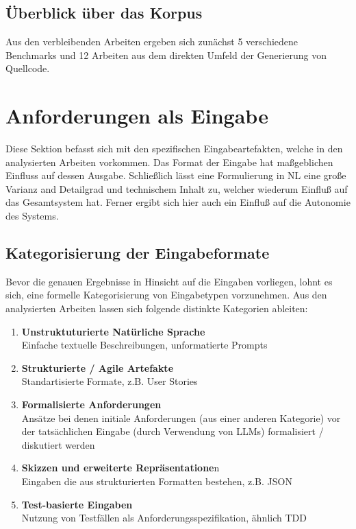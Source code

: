 \subsection{Überblick über das Korpus}

Aus den verbleibenden Arbeiten ergeben sich zunächst 5 verschiedene Benchmarks und 12 Arbeiten aus dem direkten Umfeld der Generierung von Quellcode. 

\section{Anforderungen als Eingabe}\label{ch:Anforderungen als Eingabe}

Diese Sektion befasst sich mit den spezifischen Eingabeartefakten, welche in den analysierten Arbeiten vorkommen. Das Format der Eingabe hat maßgeblichen Einfluss auf dessen Ausgabe. Schließlich lässt eine Formulierung in NL eine große Varianz and Detailgrad und technischem Inhalt zu, welcher wiederum Einfluß auf das Gesamtsystem hat. Ferner ergibt sich hier auch ein Einfluß auf die Autonomie des Systems.

\subsection{Kategorisierung der Eingabeformate}\label{ch:Kategorisierung der Eingabeformate}

Bevor die genauen Ergebnisse in Hinsicht auf die Eingaben vorliegen, lohnt es sich, eine formelle Kategorisierung von Eingabetypen vorzunehmen. Aus den analysierten Arbeiten lassen sich folgende distinkte Kategorien ableiten:

\begin{enumerate}
    \item \textbf{Unstruktuturierte Natürliche Sprache} \\ Einfache textuelle Beschreibungen, unformatierte Prompts
    \item \textbf{Strukturierte / Agile Artefakte} \\ Standartisierte Formate, z.B. User Stories
    \item \textbf{Formalisierte Anforderungen} \\ Ansätze bei denen initiale Anforderungen (aus einer anderen Kategorie) vor der tatsächlichen Eingabe (durch Verwendung von LLMs) formalisiert / diskutiert werden
    \item \textbf{Skizzen und erweiterte Repräsentatione}n \\ Eingaben die aus strukturierten Formatten bestehen, z.B. JSON
    \item \textbf{Test-basierte Eingaben} \\ Nutzung von Testfällen als Anforderungsspezifikation, ähnlich TDD
\end{enumerate}

